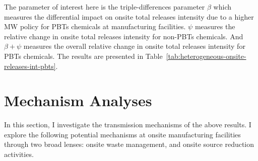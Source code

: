 \documentclass[12pt, english]{article}
\begin{document}
    The parameter of interest here is the triple-differences parameter $\beta$ which measures the differential impact on onsite total releases intensity due to a higher MW policy for PBTs chemicals at manufacturing facilities. $\psi$ measures the relative change in onsite total releases intensity for non-PBTs chemicals. And $\beta + \psi$ measures the overall relative change in onsite total releases intensity for PBTs chemicals. The results are presented in Table~\ref{tab:heterogeneous-onsite-releases-int-pbts}.
    


    \section{Mechanism Analyses}\label{sec:mechanism-analyses}
    In this section, I investigate the transmission mechanisms of the above results. I explore the following potential mechanisms at onsite manufacturing facilities through two broad lenses: onsite waste management, and onsite source reduction activities.
\end{document}
